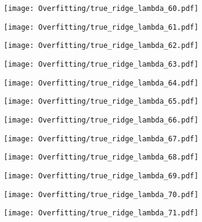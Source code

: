 \documentclass[xcolor=pdftex,dvipsnames,table]{beamer}
\begin{document}
\frame
{
	\begin{center}
		\texttt{[image: Overfitting/true\_ridge\_lambda\_60.pdf]}
	\end{center}
}

\frame
{
	\begin{center}
		\texttt{[image: Overfitting/true\_ridge\_lambda\_61.pdf]}
	\end{center}
}

\frame
{
	\begin{center}
		\texttt{[image: Overfitting/true\_ridge\_lambda\_62.pdf]}
	\end{center}
}

\frame
{
	\begin{center}
		\texttt{[image: Overfitting/true\_ridge\_lambda\_63.pdf]}
	\end{center}
}

\frame
{
	\begin{center}
		\texttt{[image: Overfitting/true\_ridge\_lambda\_64.pdf]}
	\end{center}
}

\frame
{
	\begin{center}
		\texttt{[image: Overfitting/true\_ridge\_lambda\_65.pdf]}
	\end{center}
}

\frame
{
	\begin{center}
		\texttt{[image: Overfitting/true\_ridge\_lambda\_66.pdf]}
	\end{center}
}

\frame
{
	\begin{center}
		\texttt{[image: Overfitting/true\_ridge\_lambda\_67.pdf]}
	\end{center}
}

\frame
{
	\begin{center}
		\texttt{[image: Overfitting/true\_ridge\_lambda\_68.pdf]}
	\end{center}
}

\frame
{
	\begin{center}
		\texttt{[image: Overfitting/true\_ridge\_lambda\_69.pdf]}
	\end{center}
}

\frame
{
	\begin{center}
		\texttt{[image: Overfitting/true\_ridge\_lambda\_70.pdf]}
	\end{center}
}

\frame
{
	\begin{center}
		\texttt{[image: Overfitting/true\_ridge\_lambda\_71.pdf]}
	\end{center}
}
\end{document}
